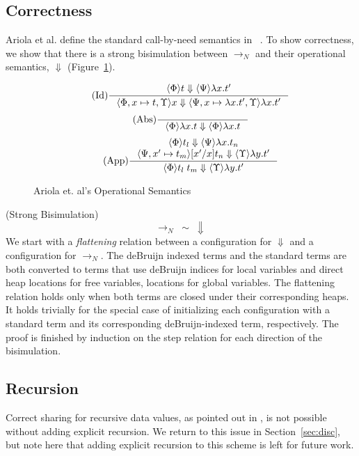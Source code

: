 \subsection{Correctness}

Ariola et al. define the standard call-by-need semantics in
~\cite{ariola1995call}. To show correctness, we show that there is a strong
bisimulation between $\rightarrow_{N}$ and their operational
semantics, $\Downarrow$ (Figure~\ref{fig:cbn}). 

\begin{figure}
\begin{align*}
\tag{Id} \inference
{\langle \Phi \rangle t \Downarrow \langle \Psi \rangle \lambda x.t'}
{\langle \Phi, x \mapsto t, \Upsilon \rangle x \Downarrow \langle \Psi, x
\mapsto \lambda x.t', \Upsilon \rangle \lambda x.t'}
\end{align*}
\begin{align*}
\tag{Abs} \inference 
{}
{\langle \Phi \rangle \lambda x . t \Downarrow \langle \Phi \rangle \lambda x.t}
\end{align*}
\begin{align*}
\tag{App} \inference
{\langle \Phi \rangle t_l \Downarrow \langle \Psi \rangle \lambda 
x.t_n \\ \langle \Psi, x' \mapsto t_m \rangle [x'/x]t_n \Downarrow \langle
\Upsilon \rangle \lambda y.t'}
{\langle \Phi \rangle t_l \; t_m \Downarrow \langle \Upsilon \rangle \lambda y.t'}
\end{align*}
\caption{Ariola et. al's Operational Semantics}
\label{fig:cbn}
\end{figure}

{\theorem \textnormal{(Strong Bisimulation)} $$\xrightarrow{}_{N} \; \sim \;
\Downarrow$$}
We start with a \emph{flattening} relation between a configuration for
$\Downarrow$ and a configuration for $\xrightarrow{}_{N}$. The deBruijn indexed
terms and the standard terms are both converted to terms that use deBruijn
indices for local variables and direct heap locations for free variables, 
locations for global variables. The flattening relation holds only when both
terms are closed under their corresponding heaps. It holds trivially for the
special case of initializing each configuration with a standard term and its
corresponding deBruijn-indexed term, respectively. The proof is finished by
induction on the step relation for each direction of the bisimulation.

\subsection{Recursion}

Correct sharing for recursive data values, as pointed out in
\cite{ariola1995call}, is not possible without adding explicit recursion. We
return to this issue in Section~\ref{sec:disc}, but note here that adding
explicit recursion to this scheme is left for future work.
